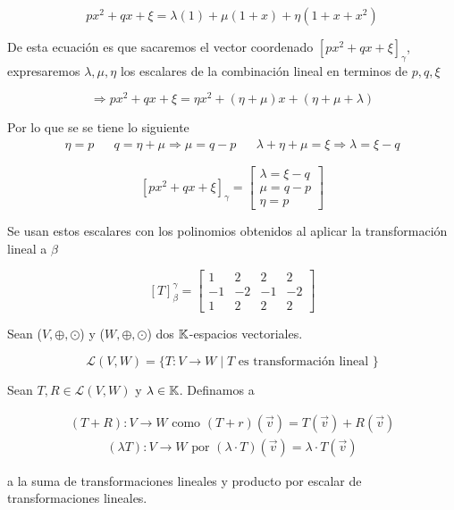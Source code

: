 \begin{proofexplanation}
    $$px^2 + qx + \xi = \lambda(1) + \mu(1+x) +  \eta(1+x+x^2)$$

    De esta ecuación es que sacaremos el vector coordenado $[px^2+qx+\xi]_\gamma$, expresaremos $\lambda, \mu, \eta$ los escalares de la combinación lineal en terminos de $p, q , \xi$
    
    $$\Rightarrow px^2 + qx + \xi  = \eta x^2 + (\eta + \mu)x + (\eta + \mu + \lambda)$$

    Por lo que se se tiene lo siguiente
    \begin{align*}
       \eta = p & & q = \eta + \mu \Rightarrow \mu = q - p & &  \lambda + \eta  + \mu = \xi \Rightarrow \lambda = \xi - q
    \end{align*}

    $$[px^2+qx+\xi]_\gamma = \begin{bmatrix}
    \lambda = \xi - q \\
    \mu = q - p \\ 
    \eta = p
    \end{bmatrix}  $$

    Se usan estos escalares con los polinomios obtenidos al aplicar la transformación lineal a $\beta$

    $${\left[ T \right]}_{\beta}^{\gamma } = \begin{bmatrix}
    1 &  2 & 2 & 2  \\
    -1 &  -2 & -1 & -2  \\ 
    1 &  2 & 2 &  2  
    \end{bmatrix} $$

\end{proofexplanation}

\begin{notation}
    Sean ($V, \oplus, \odot$) y ($W, \oplus, \odot$) dos $\mathbb{K}$-espacios vectoriales.

    $$\mathscr{L}(V,W) = \{ T : V \to W \mid T \text{ es transformación lineal }  \}$$
\end{notation}

\begin{definition} \label{def218}
    Sean $T, R \in \mathscr{L}(V,W) $ y $\lambda \in \mathbb{K}$. Definamos a
    
    \begin{align*}
        (T+R) : V \to W \text{ como } (T+r)(\vec{v}) = T(\vec{v}) + R(\vec{v})
    \end{align*}
    \begin{align*}
        (\lambda T) : V \to W \text{ por } (\lambda \cdot T)(\vec{v}) = \lambda \cdot T(\vec{v}) 
    \end{align*}

    a la suma de transformaciones lineales y producto por escalar de transformaciones lineales.
\end{definition}

